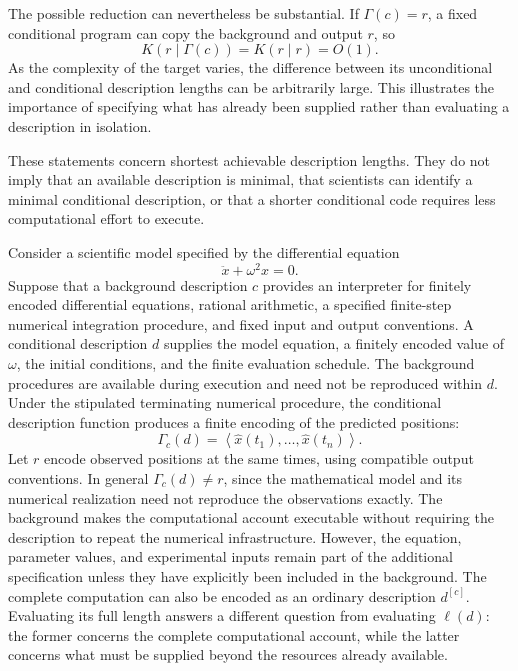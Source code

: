 The possible reduction can nevertheless be substantial. If $\Gamma(c)=r$, a fixed conditional program can copy the background and output $r$, so
\[
K(r\mid\Gamma(c))=K(r\mid r)=O(1).
\]
As the complexity of the target varies, the difference between its unconditional and conditional description lengths can be arbitrarily large. This illustrates the importance of specifying what has already been supplied rather than evaluating a description in isolation.

These statements concern shortest achievable description lengths. They do not imply that an available description is minimal, that scientists can identify a minimal conditional description, or that a shorter conditional code requires less computational effort to execute.

\begin{example}
\label{ex:conditional_description_scientific_background}
Consider a scientific model specified by the differential equation
\[
\ddot{x}+\omega^2x=0.
\]
Suppose that a background description $c$ provides an interpreter for finitely encoded differential equations, rational arithmetic, a specified finite-step numerical integration procedure, and fixed input and output conventions. A conditional description $d$ supplies the model equation, a finitely encoded value of $\omega$, the initial conditions, and the finite evaluation schedule. The background procedures are available during execution and need not be reproduced within $d$. Under the stipulated terminating numerical procedure, the conditional description function produces a finite encoding of the predicted positions:
\[
\Gamma_c(d) = \left\langle\widehat{x}(t_1),\ldots,\widehat{x}(t_n) \right\rangle.
\]
Let $r$ encode observed positions at the same times, using compatible output conventions. In general $\Gamma_c(d)\neq r$, since the mathematical model and its numerical realization need not reproduce the observations exactly. The background makes the computational account executable without requiring the description to repeat the numerical infrastructure. However, the equation, parameter values, and experimental inputs remain part of the additional specification unless they have explicitly been included in the background. The complete computation can also be encoded as an ordinary description $d^{[c]}$. Evaluating its full length answers a different question from evaluating $\ell(d)$: the former concerns the complete computational account, while the latter concerns what must be supplied beyond the resources already available.
\end{example}

